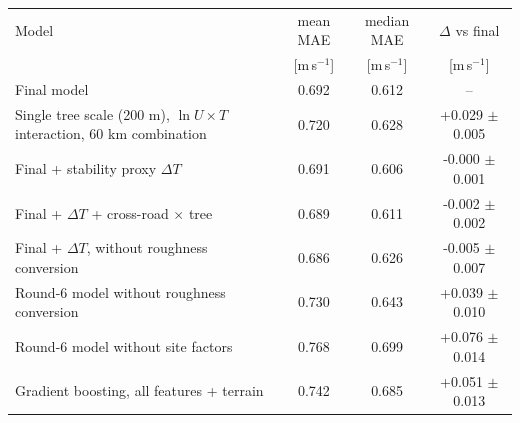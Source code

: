 \begin{tabular}{p{}ccc}
\toprule
Model & mean MAE & median MAE & $\Delta$ vs final \\
 & [m\,s$^{-1}$] & [m\,s$^{-1}$] & [m\,s$^{-1}$] \\
\midrule
Final model & 0.692 & 0.612 & -- \\
Single tree scale (200 m), $\ln U\times T$ interaction, 60 km combination & 0.720 & 0.628 & +0.029 $\pm$ 0.005 \\
Final + stability proxy $\Delta T$ & 0.691 & 0.606 & -0.000 $\pm$ 0.001 \\
Final + $\Delta T$ + cross-road $\times$ tree & 0.689 & 0.611 & -0.002 $\pm$ 0.002 \\
Final + $\Delta T$, without roughness conversion & 0.686 & 0.626 & -0.005 $\pm$ 0.007 \\
Round-6 model without roughness conversion & 0.730 & 0.643 & +0.039 $\pm$ 0.010 \\
Round-6 model without site factors & 0.768 & 0.699 & +0.076 $\pm$ 0.014 \\
Gradient boosting, all features + terrain & 0.742 & 0.685 & +0.051 $\pm$ 0.013 \\
\bottomrule
\end{tabular}

